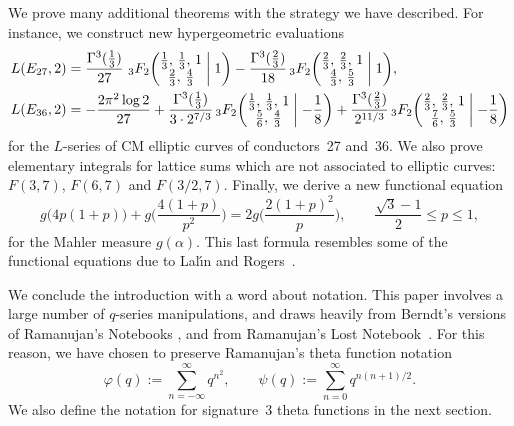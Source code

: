 \documentclass[12pt,reqno]{amsart}
\theoremstyle{remark}
\begin{document}
We prove many additional theorems with the strategy we have
described.  For instance, we construct new hypergeometric
evaluations
\begin{align*}
L(E_{27},2) &=\frac{\Gamma^3(\tfrac13)}{27}\,
\,{}_3F_2\biggl(\begin{matrix} \frac13, \, \frac13, \, 1 \\
\frac23, \, \frac43 \end{matrix}\biggm| 1 \biggr)
-\frac{\Gamma^3(\tfrac23)}{18}
\,{}_3F_2\biggl(\begin{matrix} \frac23, \, \frac23, \, 1 \\
\frac43, \, \frac53 \end{matrix}\biggm| 1 \biggr),
\\
L(E_{36},2)
&=-\frac{2\pi^2\log2}{27}+\frac{\Gamma^3(\tfrac13)}{3\cdot2^{7/3}}
\,{}_3F_2\biggl(\begin{matrix} \frac13, \, \frac13, \, 1 \\
\frac56, \, \frac43 \end{matrix}\biggm| -\frac18 \biggr)
+\frac{\Gamma^3(\tfrac23)}{2^{11/3}}
\,{}_3F_2\biggl(\begin{matrix} \frac23, \, \frac23, \, 1 \\
\frac76, \, \frac53 \end{matrix}\biggm| -\frac18 \biggr)
\end{align*}
for the $L$-series of CM elliptic curves of conductors~27 and~36. We
also prove elementary integrals for lattice sums which are not
associated to elliptic curves: $F(3,7)$, $F(6,7)$ and $F(3/2,7)$.
Finally, we derive a new functional equation
\begin{equation*}
g\bigl(4p(1+p)\bigr)+g\biggl(\frac{4(1+p)}{p^2}\biggr)=2g\biggl(\frac{2(1+p)^2}p\biggr),
\qquad \frac{\sqrt3-1}2\le p\le 1,
\end{equation*}
for the Mahler measure $g(\alpha)$.  This last formula resembles
some of the functional equations due to Lal\'\i n and Rogers~\cite{LR}.

We conclude the introduction with a word about notation. This paper
involves a large number of $q$-series manipulations, and draws
heavily from Berndt's versions of Ramanujan's Notebooks
\cite{Be3,Be4,Be5}, and from Ramanujan's Lost Notebook~\cite{BA}.
For this reason, we have chosen to preserve Ramanujan's theta
function notation
\begin{equation}\label{phipsidef}
\varphi(q):=\sum_{n=-\infty}^{\infty}q^{n^2}, \qquad
\psi(q):=\sum_{n=0}^{\infty}q^{n(n+1)/2}.
\end{equation}
We also define the notation for signature~$3$ theta functions in
the next section.
\end{document}
